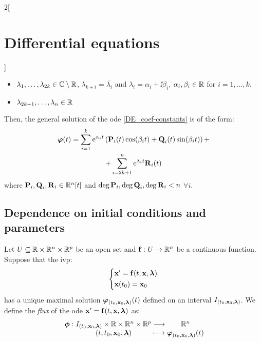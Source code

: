 \documentclass[../../../main.tex]{subfiles}
\begin{document}
\begin{multicols}{2}[\section{Differential equations}]
\begin{corollary}
    \begin{itemize}
      \item $\lambda_1,\ldots,\lambda_{2k}\in\mathbb{C}\setminus\mathbb{R}$, $\lambda_{k+i}=\overline{\lambda_i}$ and $\lambda_i=\alpha_i+\ii\beta_i$, $\alpha_i,\beta_i\in\mathbb{R}$ for $i=1,\ldots,k$.
      \item $\lambda_{2k+1},\ldots,\lambda_n\in\mathbb{R}$
    \end{itemize}
    Then, the general solution of the ode \eqref{DE_coef-constants} is of the form:
    \begin{multline*}
      \boldsymbol{\mathrm{\varphi}}(t)=\sum_{i=1}^k\mathrm{e}^{\alpha_i t}\left(\boldsymbol{\mathrm{P}}_i(t)\cos(\beta_i t)+\boldsymbol{\mathrm{Q}}_i(t)\sin(\beta_i t)\right)+\\+\sum_{i=2k+1}^n\mathrm{e}^{\lambda_i t}\boldsymbol{\mathrm{R}}_i(t)
    \end{multline*}
    where $\boldsymbol{\mathrm{P}}_i,\boldsymbol{\mathrm{Q}}_i,\boldsymbol{\mathrm{R}}_i\in\mathbb{R}^n[t]$ and $\deg \boldsymbol{\mathrm{P}}_i,\deg\boldsymbol{\mathrm{Q}}_i,\deg\boldsymbol{\mathrm{R}}_i<n$ $\forall i$.
  \end{corollary}
  \subsection{Dependence on initial conditions and parameters}
  \begin{definition}
    Let $U\subseteq\mathbb{R}\times\mathbb{R}^n\times\mathbb{R}^p$ be an open set and $\boldsymbol{\mathrm{f}}:U\rightarrow\mathbb{R}^n$ be a continuous function. Suppose that the ivp:
    \begin{equation}\label{DE_ivp_lambda}
      \left\{
      \begin{aligned}
         & \boldsymbol{\mathrm{x}}'      =\boldsymbol{\mathrm{f}}(t,\boldsymbol{\mathrm{x}},\boldsymbol{\mathrm{\lambda}}) \\
         & \boldsymbol{\mathrm{x}}(t_0)  =\boldsymbol{\mathrm{x}}_0
      \end{aligned}
      \right.
    \end{equation}
    has a unique maximal solution $\boldsymbol{\mathrm{\varphi}}_{(t_0,\boldsymbol{\mathrm{x}}_0,\boldsymbol{\mathrm{\lambda}})}(t)$ defined on an interval $I_{(t_0,\boldsymbol{\mathrm{x}}_0,\boldsymbol{\mathrm{\lambda}})}$. We define the \textit{flux} of the ode $\boldsymbol{\mathrm{x}}'=\boldsymbol{\mathrm{f}}(t,\boldsymbol{\mathrm{x}},\boldsymbol{\mathrm{\lambda}})$ as: $$\function{\vectorfunction{\phi}}{I_{(t_0,\vectorfunction{x}_0,\vectorfunction{\lambda})}\times\RR\times\RR^n\times\RR^p}{\RR^n}{(t,t_0,\vectorfunction{x}_0,\vectorfunction{\lambda})}{\vectorfunction{\varphi}_{(t_0,\vectorfunction{x}_0,\vectorfunction{\lambda})}(t)}$$
  \end{definition}

\end{multicols}
\end{document}
